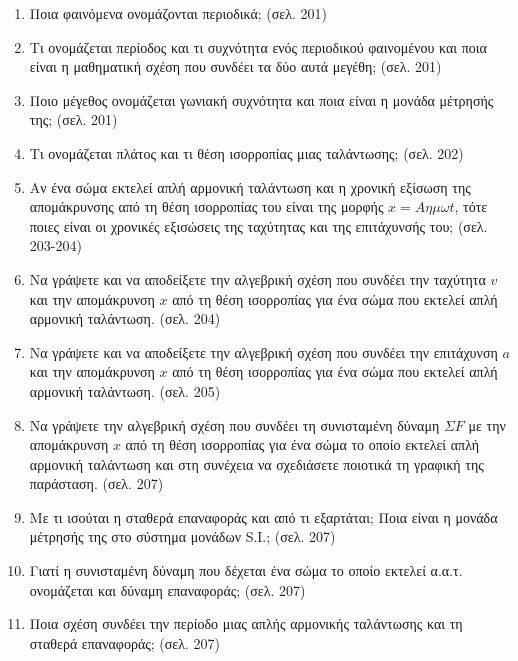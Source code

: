 \documentclass{article}
\begin{document}
\begin{enumerate}
      \item Ποια φαινόμενα ονομάζονται περιοδικά; (σελ. 201)

      \item Τι ονομάζεται περίοδος και τι συχνότητα ενός περιοδικού φαινομένου και ποια είναι η μαθηματική σχέση που συνδέει τα δύο αυτά μεγέθη; (σελ. 201)

      \item Ποιο μέγεθος ονομάζεται γωνιακή συχνότητα και ποια είναι η μονάδα μέτρησής της; (σελ. 201)

      \item Τι ονομάζεται πλάτος και τι θέση ισορροπίας μιας ταλάντωσης; (σελ. 202)

      \item Αν ένα σώμα εκτελεί απλή αρμονική ταλάντωση και η χρονική εξίσωση της απομάκρυνσης από τη θέση ισορροπίας του είναι της μορφής $x = A \eta\mu \omega t$, τότε ποιες είναι οι χρονικές εξισώσεις της ταχύτητας και της επιτάχυνσής του; (σελ. 203-204)

      \item Να γράψετε και να αποδείξετε την αλγεβρική σχέση που συνδέει την ταχύτητα $v$ και την απομάκρυνση $x$ από τη θέση ισορροπίας για ένα σώμα που εκτελεί απλή αρμονική ταλάντωση. (σελ. 204)

      \item Να γράψετε και να αποδείξετε την αλγεβρική σχέση που συνδέει την επιτάχυνση $a$ και την απομάκρυνση $x$ από τη θέση ισορροπίας για ένα σώμα που εκτελεί απλή αρμονική ταλάντωση. (σελ. 205)

      \item Να γράψετε την αλγεβρική σχέση που συνδέει τη συνισταμένη δύναμη $\Sigma F$ με την απομάκρυνση $x$ από τη θέση ισορροπίας για ένα σώμα το οποίο εκτελεί απλή αρμονική ταλάντωση και στη συνέχεια να σχεδιάσετε ποιοτικά τη γραφική της παράσταση. (σελ. 207)

      \item Με τι ισούται η σταθερά επαναφοράς και από τι εξαρτάται; Ποια είναι η μονάδα μέτρησής της στο σύστημα μονάδων S.I.; (σελ. 207)

      \item Γιατί η συνισταμένη δύναμη που δέχεται ένα σώμα το οποίο εκτελεί α.α.τ. ονομάζεται και δύναμη επαναφοράς; (σελ. 207)

      \item Ποια σχέση συνδέει την περίοδο μιας απλής αρμονικής ταλάντωσης και τη σταθερά επαναφοράς; (σελ. 207)


\end{enumerate}
\end{document}
